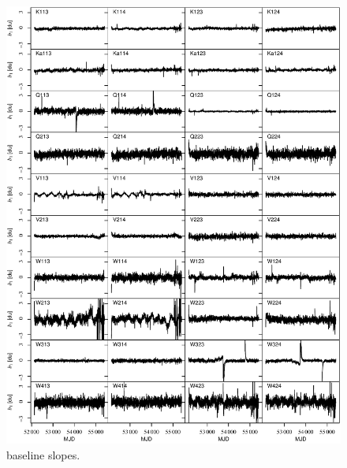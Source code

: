 \documentclass[twocolumn]{../../common/aa}
\begin{document}
\begin{figure}[p]
	\centering
	\includegraphics[width=\textwidth]{figures/instpar_CG_baseslope_v1.pdf}
	\caption{baseline slopes.}
	\label{fig:baseslope}
\end{figure}
\end{document}
